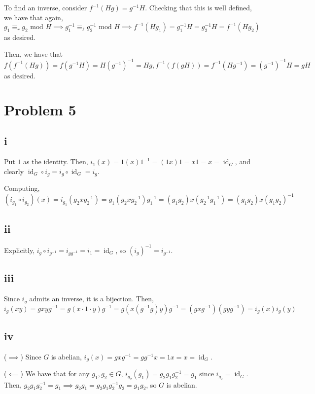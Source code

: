 \documentclass[12pt,letterpaper]{article}
\theoremstyle{definition}
\DeclareMathOperator{\Id}{id}
\begin{document}
To find an inverse, consider $f^{-1}(Hg) = g^{-1}H$. Checking that this is well defined, we have that again,
\[
  g_{1} \equiv_{r} g_{2} \text{ mod } H \implies g_{1}^{-1} \equiv_{\ell} g_{2}^{-1} \text{ mod } H \implies f^{-1}(Hg_{1}) = g_{1}^{-1}H = g_{2}^{-1}H = f^{-1}(Hg_{2})
\]
as desired.

Then, we have that
\[
  f(f^{-1}(Hg)) = f(g^{-1}H) = H(g^{-1})^{-1} = Hg,
  f^{-1}(f(gH)) = f^{-1}(Hg^{-1}) = (g^{-1})^{-1}H = gH
\]
as desired.

\section*{Problem 5}

\subsection*{i}

Put $1$ as the identity. Then, $i_{1}(x) = 1(x)1^{-1} = (1x)1 = x1 = x = \Id_{G}$, and clearly $\Id_{G} \circ i_{g} = i_{g} \circ \Id_{G} = i_{g}$.

Computing,
\[
  (i_{g_{1}} \circ i_{g_{2}})(x) = i_{g_{1}}(g_{2}xg_{2}^{-1}) = g_{1}(g_{2}xg_{2}^{-1})g_{1}^{-1} = (g_{1}g_{2})x(g_{2}^{-1}g_{1}^{-1}) = (g_{1}g_{2})x(g_{1}g_{2})^{-1}
\]

\subsection*{ii}

Explicitly, $i_{g} \circ i_{g^{-1}} = i_{g g^{-1}} = i_{1} = \Id_{G}$, so $(i_{g})^{-1} = i_{g^{-1}}$.

\subsection*{iii}

Since $i_{g}$ admits an inverse, it is a bijection. Then,
\[
  i_{g}(xy) = gxyg^{-1} = g(x \cdot 1 \cdot y)g^{-1} = g(x(g^{-1}g)y)g^{-1} = (gxg^{-1})(gyg^{-1}) = i_{g}(x)i_{g}(y)
\]

\subsection*{iv}

($\implies$) Since $G$ is abelian, $i_{g}(x) = gxg^{-1} = gg^{-1}x = 1x = x = \Id_{G}$.

($\impliedby$) We have that for any $g_{1}, g_{2} \in G$, $i_{g_{2}}(g_{1}) = g_{2}g_{1}g_{2}^{-1} = g_{1}$ since $i_{g_{2}} = \Id_{G}$. Then, $g_{2}g_{1}g_{2}^{-1} = g_{1} \implies g_{2}g_{1} = g_{2}g_{1}g_{2}^{-1}g_{2} = g_{1}g_{2}$, so $G$ is abelian.
\end{document}
